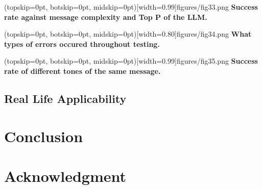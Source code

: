 \documentclass{ieeeaccess}
\begin{document}
\Figure[t!](topskip=0pt, botskip=0pt,
midskip=0pt)[width=0.99\columnwidth]{{figures/fig33.png}}
{ \textbf{Success rate against message complexity and Top P of the LLM.}\label{fig11}}

\Figure[t!](topskip=0pt, botskip=0pt,
midskip=0pt)[width=0.80\columnwidth]{{figures/fig34.png}}
{ \textbf{What types of errors occured throughout testing.}\label{fig12}}

\Figure[t!](topskip=0pt, botskip=0pt,
midskip=0pt)[width=0.99\columnwidth]{{figures/fig35.png}}
{ \textbf{Success rate of different tones of the same message.}\label{fig13}}


\subsection{Real Life Applicability}

\section{Conclusion}


\section*{Acknowledgment}
\end{document}
